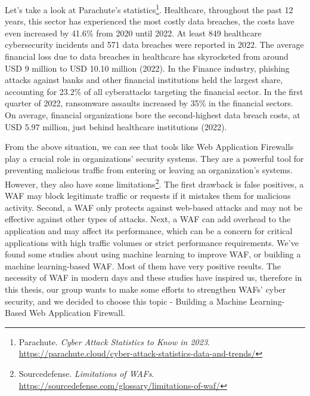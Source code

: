 
Let's take a look at Parachute's statistics\footnote{Parachute. 
\textit{Cyber Attack Statistics to Know in 2023}. \url{https://parachute.cloud/cyber-attack-statistics-data-and-trends/}}. 
Healthcare, throughout the past 12 years, this sector has experienced the most costly data breaches, the costs have even increased by 41.6\% from 2020 until 2022. At least 849 healthcare cybersecurity incidents and 571 data breaches were reported in 2022. The average financial loss due to data breaches in healthcare has skyrocketed from around USD 9 million to USD 10.10 million (2022). In the Finance industry, phishing attacks against banks and other financial institutions held the largest share, accounting for 23.2\% of all cyberattacks targeting the financial sector. In the first quarter of 2022, ransomware assaults increased by 35\% in the financial sectors. On average, financial organizations bore the second-highest data breach costs, at USD 5.97 million, just behind healthcare institutions (2022). 

From the above situation, we can see that tools like Web Application Firewalls play a crucial role in organizations' security systems. They are a powerful tool for preventing malicious traffic from entering or leaving an organization's systems. However, they also have some limitations\footnote{Sourcedefense. \textit{Limitations of WAFs}. \url{https://sourcedefense.com/glossary/limitations-of-waf/}}. The first drawback is false positives, a WAF may block legitimate traffic or requests if it mistakes them for malicious activity. Second, a WAF only protects against web-based attacks and may not be effective against other types of attacks. Next, a WAF can add overhead to the application and may affect its performance, which can be a concern for critical applications with high traffic volumes or strict performance requirements. We've found some studies about using machine learning to improve WAF, or building a machine learning-based WAF. Most of them have very positive results. The necessity of WAF in modern days and these studies have inspired us, therefore in this thesis, our group wants to make some efforts to strengthen WAFs' cyber security, and we decided to choose this topic - Building a Machine Learning-Based Web Application Firewall.
\newpage
